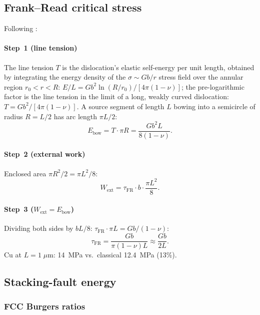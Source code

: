 \documentclass[3p]{elsarticle}
\begin{document}
\subsection{Frank--Read critical stress}
\label{sec:FR}

Following \citet{frank-read1950}:

\paragraph{Step~1 (line tension)}
The line tension $T$ is the dislocation's elastic self-energy per
unit length, obtained by integrating the energy density of the
$\sigma\sim Gb/r$ stress field over the annular region
$r_0<r<R$: $E/L=Gb^2\ln(R/r_0)/[4\pi(1-\nu)]$; the pre-logarithmic
factor is the line tension in the limit of a long, weakly curved
dislocation:
$T=Gb^2/[4\pi(1-\nu)]$. A source segment of length $L$ bowing into
a semicircle of radius $R=L/2$ has arc
length $\pi L/2$:
\begin{equation}
  E_\text{bow}=T\cdot\pi R=\frac{Gb^2L}{8(1-\nu)}.
  \label{eq:Ebow}
\end{equation}

\paragraph{Step~2 (external work)}
Enclosed area $\pi R^2/2=\pi L^2/8$:
\begin{equation}
  W_\text{ext}=\tau_\text{FR}\cdot b\cdot\frac{\pi L^2}{8}.
  \label{eq:Wext}
\end{equation}

\paragraph{Step~3 ($W_\text{ext}=E_\text{bow}$)}
Dividing both sides by $bL/8$:
$\tau_\text{FR}\cdot\pi L=Gb/(1-\nu)$:
\begin{equation}
  \boxed{\tau_\text{FR}=\frac{Gb}{\pi(1-\nu)L}\approx\frac{Gb}{2L}.}
  \label{eq:FR}
\end{equation}
Cu at $L=1\;\mu$m: 14~MPa vs.\ classical 12.4~MPa (13\%).

\subsection{Stacking-fault energy}
\label{sec:SFE}

\subsubsection{FCC Burgers ratios}
\end{document}

